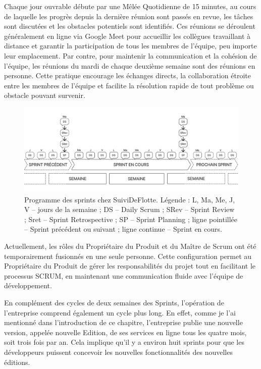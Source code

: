 Chaque jour ouvrable débute par une Mêlée Quotidienne de 15 minutes, au cours de laquelle les progrès depuis la dernière réunion sont passés en revue, les tâches sont discutées et les obstacles potentiels sont identifiés. Ces réunions se déroulent généralement en ligne via Google Meet pour accueillir les collègues travaillant à distance et garantir la participation de tous les membres de l'équipe, peu importe leur emplacement. Par contre, pour maintenir la communication et la cohésion de l'équipe, les réunions du mardi de chaque deuxième semaine sont des réunions en personne. Cette pratique encourage les échanges directs, la collaboration étroite entre les membres de l'équipe et facilite la résolution rapide de tout problème ou obstacle pouvant survenir.

\begin{figure}[h]
    \centering
    \includegraphics[width=\textwidth]{img/sprint04}
    \caption{Programme des sprints chez SuiviDeFlotte. Légende : L, Ma, Me, J, V -- jours de la semaine ; DS -- Daily Scrum ; SRev -- Sprint Review ; Sret -- Sprint Retrospective ; SP -- Sprint Planning ; ligne pointillée -- Sprint précédent ou suivant ; ligne continue -- Sprint en cours.}
    \label{fig:sprint}
\end{figure}

Actuellement, les rôles du Propriétaire du Produit et du Maître de Scrum ont été temporairement fusionnés en une seule personne. Cette configuration permet au Propriétaire du Produit de gérer les responsabilités du projet tout en facilitant le processus SCRUM, en maintenant une communication fluide avec l'équipe de développement.

En complément des cycles de deux semaines des Sprints, l'opération de l'entreprise comprend également un cycle plus long. En effet, comme je l'ai mentionné dans l'introduction de ce chapitre, l'entreprise publie une nouvelle version, appelée nouvelle Edition, de ses services en ligne tous les quatre mois, soit trois fois par an. Cela implique qu'il y a environ huit sprints pour que les développeurs puissent concevoir les nouvelles fonctionnalités des nouvelles éditions.

